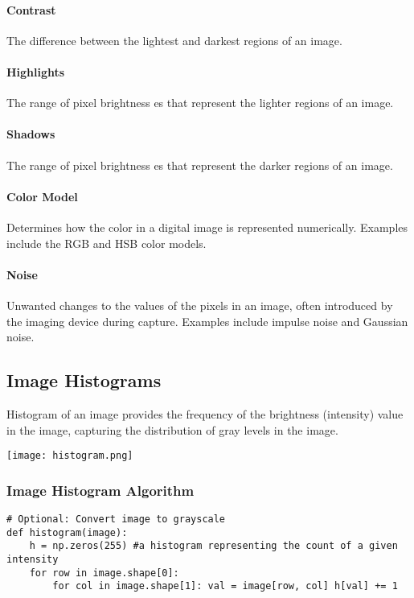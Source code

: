 \documentclass{article}
\begin{document}
\paragraph{Contrast} The difference between the lightest and darkest regions of an image.

\paragraph{Highlights}The range of pixel brightness es that represent the lighter regions of an image.

\paragraph{Shadows}The range of pixel brightness es that represent the darker regions of an image.

\paragraph{Color Model} Determines how the color in a digital image is represented numerically. Examples include the RGB and HSB color models.

\paragraph{Noise} Unwanted changes to the values of the pixels in an image, often introduced by the imaging device during capture. Examples include impulse noise and Gaussian noise.
\subsection{Image Histograms}
Histogram of an image provides the frequency of the brightness (intensity) value in the image, capturing the distribution of gray levels in the image.

\texttt{[image: histogram.png]}
 
\subsubsection{Image Histogram Algorithm}

\begin{verbatim}
# Optional: Convert image to grayscale
def histogram(image):
    h = np.zeros(255) #a histogram representing the count of a given intensity
    for row in image.shape[0]:
        for col in image.shape[1]: val = image[row, col] h[val] += 1
\end{verbatim}
\end{document}
